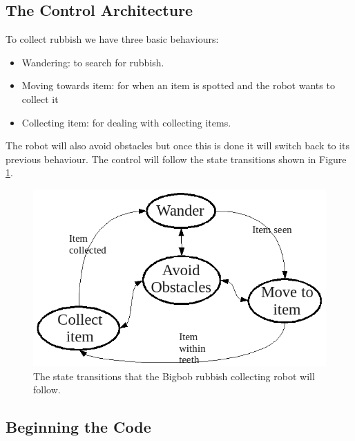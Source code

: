 \documentclass[a4paper]{report}
\begin{document}
\subsection{The Control Architecture}\label{sec:Coding:UsingProxiesExample:ControlArch}
To collect rubbish we have three basic behaviours: 
\begin{itemize}
	\item Wandering: to search for rubbish. 
	\item Moving towards item: for when an item is spotted and the robot wants to collect it
	\item Collecting item: for dealing with collecting items.
\end{itemize}
The robot will also avoid obstacles but once this is done it will switch back to its previous behaviour. The control will follow the state transitions shown in Figure \ref{fig:Coding:UsingProxiesExample:ControlArch:Structure}.

\begin{figure}
	\centering
	\includegraphics[width=\linewidth]{./pics/coding/arch_structureOA.png}
	\caption{The state transitions that the Bigbob rubbish collecting robot will follow.}
	\label{fig:Coding:UsingProxiesExample:ControlArch:Structure}
\end{figure} 

\subsection{Beginning the Code}\label{sec:Coding:UsingProxiesExample:BeginningCode}
\end{document}
